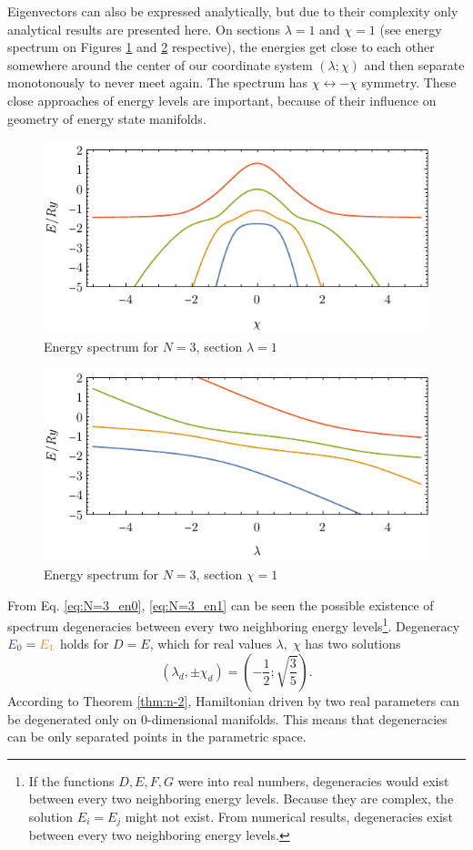 Eigenvectors can also be expressed analytically, but due to their complexity only analytical results are presented here. On sections $\lambda=1$ and $\chi=1$ (see energy spectrum on Figures \ref{fig:N=3_energiesl} and \ref{fig:N=3_energiesc} respective), the energies get close to each other somewhere around the center of our coordinate system $(\lambda;\chi)$ and then separate monotonously to never meet again. The spectrum has $\chi\leftrightarrow -\chi$ symmetry. These close approaches of energy levels are important, because of their influence on geometry of energy state manifolds.
\begin{figure}[h]
    \centering
    \includegraphics[scale=1.3]{../img/N=3_energiesl.pdf}
    \caption{Energy spectrum for $N=3$, section $\lambda=1$}
    \label{fig:N=3_energiesl}
\end{figure}
\begin{figure}[h]
    \centering
    \includegraphics[scale=1.3]{../img/N=3_energiesc.pdf}
    \caption{Energy spectrum for $N=3$, section $\chi=1$}
    \label{fig:N=3_energiesc}
\end{figure}

From Eq. \ref{eq:N=3_en0}, \ref{eq:N=3_en1} can be seen the possible existence of spectrum degeneracies between every two neighboring energy levels\footnote{If the functions $D,E,F,G$ were into real numbers, degeneracies would exist between every two neighboring energy levels. Because they are complex, the solution $E_i=E_j$ might not exist. From numerical results, degeneracies exist between every two neighboring energy levels.}. Degeneracy $\bluee{E_0}=\textcolor{orange}{E_1}$ holds for $D=E$, which for real values $\lambda,\;\chi$ has two solutions
$$(\lambda_d,\pm \chi_d)=\left(-\frac{1}{2};\sqrt{\frac{3}{5}}\right).$$
According to Theorem \ref{thm:n-2}, Hamiltonian driven by two real parameters can be degenerated only on 0-dimensional manifolds. This means that degeneracies can be only separated points in the parametric space.

